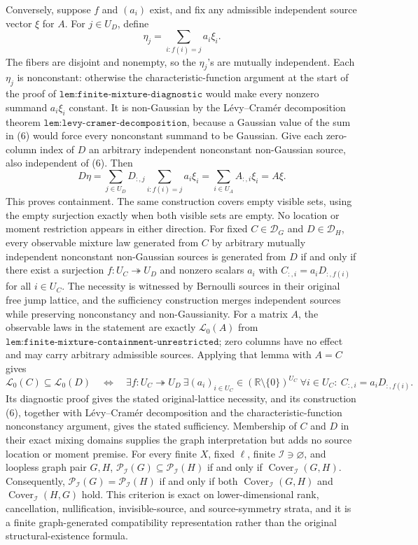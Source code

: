 Conversely, suppose \(f\) and \((a_i)\) exist, and fix any admissible independent source vector \(\xi\) for \(A\). For \(j\in U_D\), define
\[
\eta_j=\sum_{i:f(i)=j}a_i\xi_i. \tag{6}
\]
The fibers are disjoint and nonempty, so the \(\eta_j\)'s are mutually independent. Each \(\eta_j\) is nonconstant: otherwise the characteristic-function argument at the start of the proof of \(\texttt{lem:finite-mixture-diagnostic}\) would make every nonzero summand \(a_i\xi_i\) constant. It is non-Gaussian by the L\'evy--Cram\'er decomposition theorem \(\texttt{lem:levy-cramer-decomposition}\), because a Gaussian value of the sum in (6) would force every nonconstant summand to be Gaussian. Give each zero-column index of \(D\) an arbitrary independent nonconstant non-Gaussian source, also independent of (6). Then
\[
D\eta=\sum_{j\in U_D}D_{:,j}\sum_{i:f(i)=j}a_i\xi_i
=\sum_{i\in U_A}A_{:,i}\xi_i=A\xi.
\]
This proves containment. The same construction covers empty visible sets, using the empty surjection exactly when both visible sets are empty. No location or moment restriction appears in either direction.
For fixed \(C\in\mathcal D_G\) and \(D\in\mathcal D_H\), every observable mixture law generated from \(C\) by arbitrary mutually independent nonconstant non-Gaussian sources is generated from \(D\) if and only if there exist a surjection \(f:U_C\twoheadrightarrow U_D\) and nonzero scalars \(a_i\) with \(C_{:,i}=a_iD_{:,f(i)}\) for all \(i\in U_C\). The necessity is witnessed by Bernoulli sources in their original free jump lattice, and the sufficiency construction merges independent sources while preserving nonconstancy and non-Gaussianity.
For a matrix \(A\), the observable laws in the statement are exactly \(\mathscr L_0(A)\) from \(\texttt{lem:finite-mixture-containment-unrestricted}\); zero columns have no effect and may carry arbitrary admissible sources. Applying that lemma with \(A=C\) gives
\[
\mathscr L_0(C)\subseteq\mathscr L_0(D)
\quad\Longleftrightarrow\quad
\exists f:U_C\twoheadrightarrow U_D\ \exists(a_i)_{i\in U_C}\in(\mathbb R\setminus\{0\})^{U_C}\ 
\forall i\in U_C:\ C_{:,i}=a_iD_{:,f(i)}.
\]
Its diagnostic proof gives the stated original-lattice necessity, and its construction (6), together with L\'evy--Cram\'er decomposition and the characteristic-function nonconstancy argument, gives the stated sufficiency. Membership of \(C\) and \(D\) in their exact mixing domains supplies the graph interpretation but adds no source location or moment premise.
For every finite \(X\), fixed \(\ell\), finite \(\mathcal I\ni\varnothing\), and loopless graph pair \(G,H\), \(\mathcal P_{\mathcal I}(G)\subseteq\mathcal P_{\mathcal I}(H)\) if and only if \(\operatorname{Cover}_{\mathcal I}(G,H)\). Consequently, \(\mathcal P_{\mathcal I}(G)=\mathcal P_{\mathcal I}(H)\) if and only if both \(\operatorname{Cover}_{\mathcal I}(G,H)\) and \(\operatorname{Cover}_{\mathcal I}(H,G)\) hold. This criterion is exact on lower-dimensional rank, cancellation, nullification, invisible-source, and source-symmetry strata, and it is a finite graph-generated compatibility representation rather than the original structural-existence formula.
